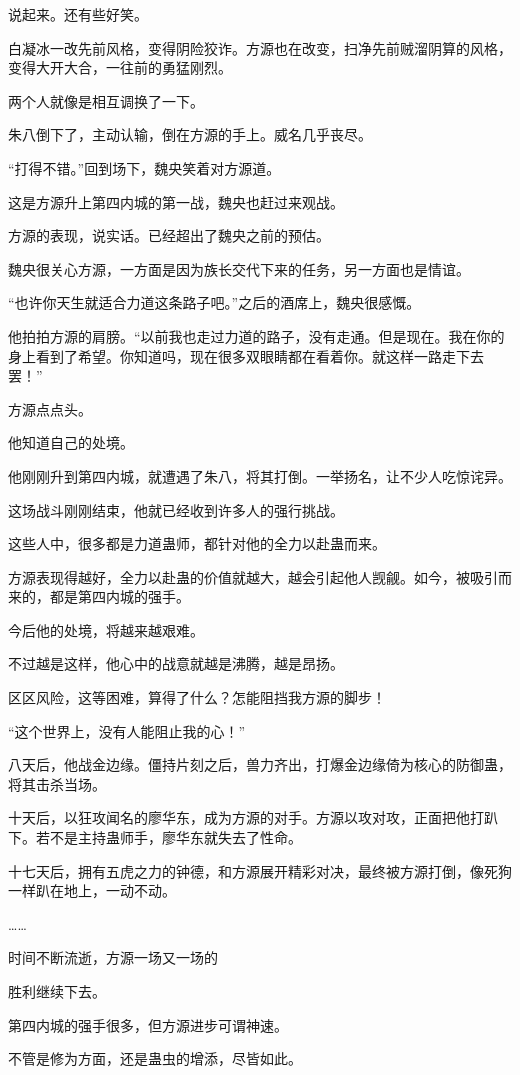 \begin{this_body}
说起来。还有些好笑。

白凝冰一改先前风格，变得阴险狡诈。方源也在改变，扫净先前贼溜阴算的风格，变得大开大合，一往前的勇猛刚烈。

两个人就像是相互调换了一下。

朱八倒下了，主动认输，倒在方源的手上。威名几乎丧尽。

“打得不错。”回到场下，魏央笑着对方源道。

这是方源升上第四内城的第一战，魏央也赶过来观战。

方源的表现，说实话。已经超出了魏央之前的预估。

魏央很关心方源，一方面是因为族长交代下来的任务，另一方面也是情谊。

“也许你天生就适合力道这条路子吧。”之后的酒席上，魏央很感慨。

他拍拍方源的肩膀。“以前我也走过力道的路子，没有走通。但是现在。我在你的身上看到了希望。你知道吗，现在很多双眼睛都在看着你。就这样一路走下去罢！”

方源点点头。

他知道自己的处境。

他刚刚升到第四内城，就遭遇了朱八，将其打倒。一举扬名，让不少人吃惊诧异。

这场战斗刚刚结束，他就已经收到许多人的强行挑战。

这些人中，很多都是力道蛊师，都针对他的全力以赴蛊而来。

方源表现得越好，全力以赴蛊的价值就越大，越会引起他人觊觎。如今，被吸引而来的，都是第四内城的强手。

今后他的处境，将越来越艰难。

不过越是这样，他心中的战意就越是沸腾，越是昂扬。

区区风险，这等困难，算得了什么？怎能阻挡我方源的脚步！

“这个世界上，没有人能阻止我的心！”

八天后，他战金边缘。僵持片刻之后，兽力齐出，打爆金边缘倚为核心的防御蛊，将其击杀当场。

十天后，以狂攻闻名的廖华东，成为方源的对手。方源以攻对攻，正面把他打趴下。若不是主持蛊师手，廖华东就失去了性命。

十七天后，拥有五虎之力的钟德，和方源展开精彩对决，最终被方源打倒，像死狗一样趴在地上，一动不动。

……

时间不断流逝，方源一场又一场的

胜利继续下去。

第四内城的强手很多，但方源进步可谓神速。

不管是修为方面，还是蛊虫的增添，尽皆如此。


\end{this_body}
